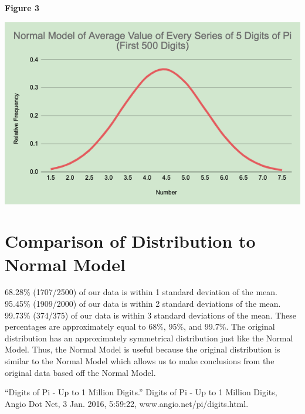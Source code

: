 \documentclass{article}
\begin{document}
\centerline{\textbf{Figure 3}}

{\includegraphics[width=\textwidth]{normdist.png}}

\section{Comparison of Distribution to Normal Model}
{68.28\% (1707/2500) of our data is within 1 standard deviation of the mean.}
{95.45\% (1909/2000) of our data is within 2 standard deviations of the mean.}
{99.73\% (374/375) of our data is within 3 standard deviations of the mean.}
{These percentages are approximately equal to 68\%, 95\%, and 99.7\%. The original distribution has an approximately symmetrical distribution just like the Normal Model. Thus, the Normal Model is useful because the original distribution is similar to the Normal Model which allows us to make conclusions from the original data based off the Normal Model.}

  

\begin{thebibliography}{1}

{“Digits of Pi - Up to 1 Million Digits.” Digits of Pi - Up to 1 Million Digits, Angio Dot Net, 3 Jan. 2016, 5:59:22, www.angio.net/pi/digits.html.}

\end{thebibliography}
\end{document}
